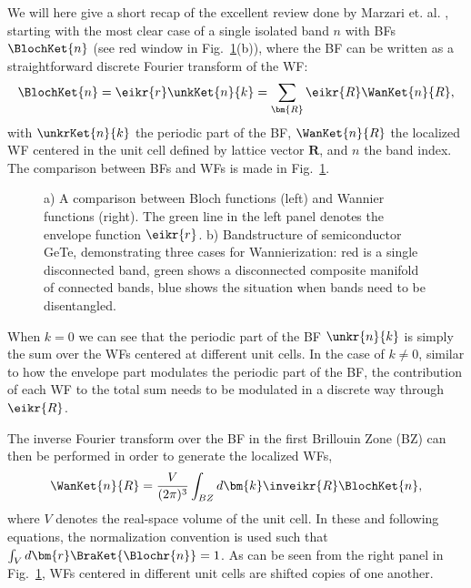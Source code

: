 We will here give a short recap of the excellent review done by Marzari et. al. \cite{Marzari2012}, starting with the most clear case of a single isolated band $n$ with BFs $\BlochKet{n}$ (see red window in Fig.~\ref{fig:Theory_blochvswan}(b)), where the BF can be written as a straightforward discrete Fourier transform of the WF: 
\begin{equation}
	\label{eq:Theory_1bandwan}
	\BlochKet{n} = \eikr{r} \unkKet{n}{k} = \sum_{\bm{R}} \eikr{R} \WanKet{n}{R},
\end{equation}
with $\unkrKet{n}{k}$ the periodic part of the BF, $\WanKet{n}{R}$ the localized WF centered in the unit cell defined by lattice vector $\bm{R}$, and $n$ the band index.
The comparison between BFs and WFs is made in Fig.~\ref{fig:Theory_blochvswan}.
\begin{figure}
	\begin{subfigure}{0.49\textwidth}
		\caption{}
	\end{subfigure}
	\begin{subfigure}{0.49\textwidth}
		\caption{}
	\end{subfigure}
	\caption{\label{fig:Theory_blochvswan} a) A comparison between Bloch functions (left) and Wannier functions (right). The green line in the left panel denotes the envelope function $\eikr{r}$. b) Bandstructure of semiconductor GeTe, demonstrating three cases for Wannierization: red is a single disconnected band, green shows a disconnected composite manifold of connected bands, blue shows the situation when bands need to be disentangled.}
\end{figure}
When $k=0$ we can see that the periodic part of the BF $\unkr{n}{k}$ is simply the sum over the WFs centered at different unit cells.
In the case of $k \neq 0$, similar to how the envelope part modulates the periodic part of the BF, the contribution of each WF to the total sum needs to be modulated in a discrete way through $\eikr{R}$.

The inverse Fourier transform over the BF in the first Brillouin Zone (BZ) can then be performed in order to generate the localized WFs,
\begin{equation}
	\label{eq:Theory_wanfourier}
	\WanKet{n}{R} = \frac{V}{(2\pi)^3} \int_{BZ} d \bm{k} \inveikr{R} \BlochKet{n},
\end{equation}
where $V$ denotes the real-space volume of the unit cell.
In these and following equations, the normalization convention is used such that $\int_V d\bm{r}\BraKet{\Blochr{n}} = 1$.
As can be seen from the right panel in Fig.~\ref{fig:Theory_blochvswan}, WFs centered in different unit cells are shifted copies of one another.

